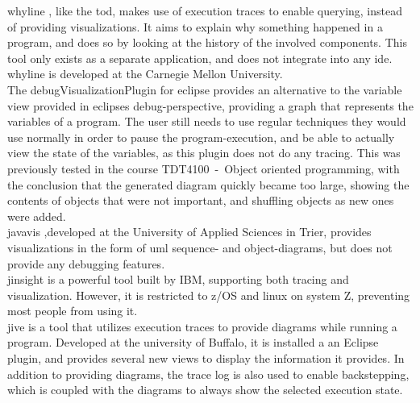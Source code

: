 \Gls{whyline} \cite{ko2009}, like the \gls{tod}, makes use of execution traces to enable querying, instead of providing visualizations.
It aims to explain why something happened in a program, and does so by looking at the history of the involved components.
This tool only exists as a separate application, and does not integrate into any \gls{ide}.
\Gls{whyline} is developed at the Carnegie Mellon University.
~\\

The \gls{debugVisualizationPlugin} for eclipse provides an alternative to the variable view provided in eclipses debug-perspective, providing a graph that represents the variables of a program.
The user still needs to use regular techniques they would use normally in order to pause the program-execution, and be able to actually view the state of the variables, as this plugin does not do any tracing.
This was previously tested in the course TDT4100~-~Object oriented programming, with the conclusion that the generated diagram quickly became too large, showing the contents of objects that were not important, and shuffling objects as new ones were added.%
~\\

\Gls{javavis} \cite{Oechsle2002},developed at the University of Applied Sciences in Trier, provides visualizations in the form of \gls{uml} sequence- and object-diagrams, but does not provide any debugging features.
~\\

\Gls{jinsight} \cite{Pauw} is a powerful tool built by IBM, supporting both tracing and visualization.
However, it is restricted to z/OS and linux on system Z, preventing most people from using it.
~\\

\gls{jive} is a tool that utilizes execution traces to provide diagrams while running a program.
Developed at the university of Buffalo, it is installed a an Eclipse plugin, and provides several new views to display the information it provides.
In addition to providing diagrams, the trace log is also used to enable backstepping, which is coupled with the diagrams to always show the selected execution state.
~\\

